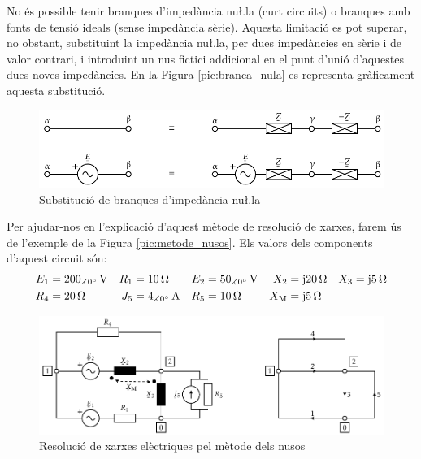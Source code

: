 No \'{e}s possible tenir branques d'imped\`{a}ncia nu{\l.l}a (curt circuits) o
branques amb fonts de tensi\'{o} ideals (sense imped\`{a}ncia s\`{e}rie).
Aquesta limitaci\'{o} es pot superar, no obstant, substituint la
imped\`{a}ncia nu{\l.l}a, per dues imped\`{a}ncies en s\`{e}rie i de valor
contrari, i introduint un nus fictici addicional en el punt d'uni\'{o}
d'aquestes dues noves imped\`{a}ncies. En la Figura
\vref{pic:branca_nula}
 es representa gr\`{a}ficament aquesta substituci\'{o}. 
\begin{figure}[htb]
\centering
   \includegraphics{Imatges/Cap-ResXarxElec-Branques-Z0.pdf}
\caption{Substituci\'{o} de branques d'imped\`{a}ncia nu{\l.l}a}
\label{pic:branca_nula}
\end{figure}

Per ajudar-nos en l'explicaci\'{o} d'aquest m\`{e}tode de resoluci\'{o} de xarxes, farem
\'{u}s de l'exemple de la Figura \vref{pic:metode_nusos}. Els valors dels components d'aquest
circuit s\'{o}n:
\begin{align*}
   \cmplx{E}_1 &= 200_{\measuredangle 0\degree}\unit{V} & R_1 &= 10\unit{\ohm} &
   \cmplx{E}_2 &= 50_{\measuredangle 0\degree}\unit{V}  & \cmplx{X}_2 &= \ju 20\unit{\ohm} &
   \cmplx{X}_3 &= \ju 5\unit{\ohm} \\
   R_4 &= 20\unit{\ohm} & \cmplx{J}_5 &= 4_{\measuredangle 0\degree}\unit{A} &
   R_5 &= 10\unit{\ohm} & \cmplx{X}\ped{M} &= \ju 5\unit{\ohm}
\end{align*}

\begin{figure}[htb]
\vspace{-4mm} \centering
    \includegraphics{Imatges/Cap-ResXarxElec-Circuit-Graf.pdf}
   \caption{Resoluci\'{o} de xarxes el\`{e}ctriques pel m\`{e}tode dels nusos} \label{pic:metode_nusos}
\end{figure}

